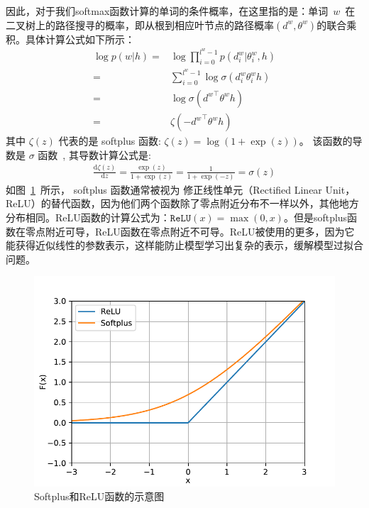 因此，对于我们softmax函数计算的单词的条件概率，在这里指的是：单词~$w$~在二叉树上的路径搜寻的概率，即从根到相应叶节点的路径概率$(d^w,\theta^w)$的联合乘积。具体计算公式如下所示：
\begin{equation}\label{equ:pw}
\begin{split}
 \log p(w|h)=&\log\prod_{i=0}^{l^w-1} p(d^w_i|\theta_{i}^w,h) \\
 =& \sum_{i=0}^{l^w -1} \log\sigma(d_i^w \theta_{i}^w h)\\
 =&\log\sigma({d^w}^\top \theta^w h)\\
 =&\zeta(- {d^w}^\top \theta^w h )
 \end{split}
\end{equation}
其中 $\zeta(z)$ 代表的是 softplus 函数: $\zeta(z)= \log (1+\exp(z))$。 该函数的导数是 $\sigma$ 函数~, 其导数计算公式是:
\begin{equation}\label{equ:zeta}
\begin{split}
\frac{\mathrm{d}\zeta(z)}{\mathrm{d} z}=\frac{\exp(z)}{1+\exp(z)} =\frac{1}{1+\exp(-z)} =\sigma(z)
\end{split}
\end{equation}
如图~\ref{fig:soft}~所示， softplus 函数通常被视为 修正线性单元（Rectified Linear Unit，ReLU）的替代函数，因为他们两个函数除了零点附近分布不一样以外，其他地方分布相同。ReLU函数的计算公式为：$\mathtt{ReLU}(x)=\max(0,x)$。但是softplus函数在零点附近可导，ReLU函数在零点附近不可导。ReLU被使用的更多，因为它能获得近似线性的参数表示，这样能防止模型学习出复杂的表示，缓解模型过拟合问题。
\begin{figure}[!ht]
  \centering
\includegraphics[width=.65\linewidth]{./figures/relus.pdf}
\caption{Softplus和ReLU函数的示意图}\label{fig:soft}
\end{figure}

